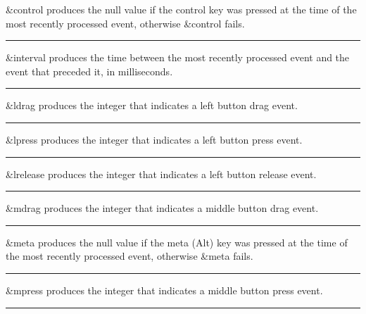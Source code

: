 \noindent
\textsf{\&control} produces the null value if the control key was
pressed at the time of the most recently processed event, otherwise
\textsf{\&control} fails.

\bigskip\hrule\vspace{0.1cm}

\noindent
\textsf{\&interval} produces the time between the most recently
processed event and the event that preceded it, in milliseconds.

\bigskip\hrule\vspace{0.1cm}

\noindent
\textsf{\&ldrag} produces the integer that indicates a left button drag
event.

\bigskip\hrule\vspace{0.1cm}

\noindent
\textsf{\&lpress} produces the integer that indicates a left button
press event.

\bigskip\hrule\vspace{0.1cm}

\noindent
\textsf{\&lrelease} produces the integer that indicates a left button
release event.

\bigskip\hrule\vspace{0.1cm}

\noindent
\textsf{\&mdrag} produces the integer that indicates a middle button drag event.

\bigskip\hrule\vspace{0.1cm}

\noindent
\textsf{\&meta} produces the null value if the meta (Alt) key was
pressed at the time of the most recently processed event, otherwise
\textsf{\&meta} fails.

\bigskip\hrule\vspace{0.1cm}

\noindent
\textsf{\&mpress} produces the integer that indicates a middle button
press event.

\bigskip\hrule\vspace{0.1cm}

